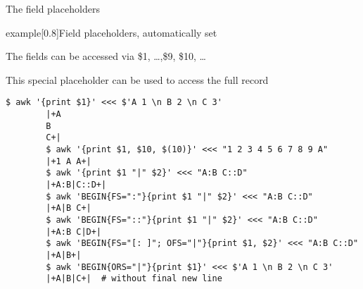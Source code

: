 \begin{frame}[fragile]{The field placeholders}
    \vspace{-4mm}
    \begin{varblock}{example}[0.8\textwidth]{Field placeholders, automatically set}
        \begin{description}[XXXXXX]
            \item[\$n] The fields can be accessed via \$1, \ldots,\$9, \$10, \ldots
            \item[\$0] This special placeholder can be used to access the full record
        \end{description}
    \end{varblock}
    \begin{lstlisting}[style=MyBash, xleftmargin=3mm, xrightmargin=3mm]
        $ awk '{print $1}' <<< $'A 1 \n B 2 \n C 3'
        |+A
        B
        C+|
        $ awk '{print $1, $10, $(10)}' <<< "1 2 3 4 5 6 7 8 9 A"
        |+1 A A+|
        $ awk '{print $1 "|" $2}' <<< "A:B C::D"
        |+A:B|C::D+|
        $ awk 'BEGIN{FS=":"}{print $1 "|" $2}' <<< "A:B C::D"
        |+A|B C+|
        $ awk 'BEGIN{FS="::"}{print $1 "|" $2}' <<< "A:B C::D"
        |+A:B C|D+|
        $ awk 'BEGIN{FS="[: ]"; OFS="|"}{print $1, $2}' <<< "A:B C::D"
        |+A|B+|
        $ awk 'BEGIN{ORS="|"}{print $1}' <<< $'A 1 \n B 2 \n C 3'
        |+A|B|C+|  # without final new line
    \end{lstlisting}
\end{frame}
